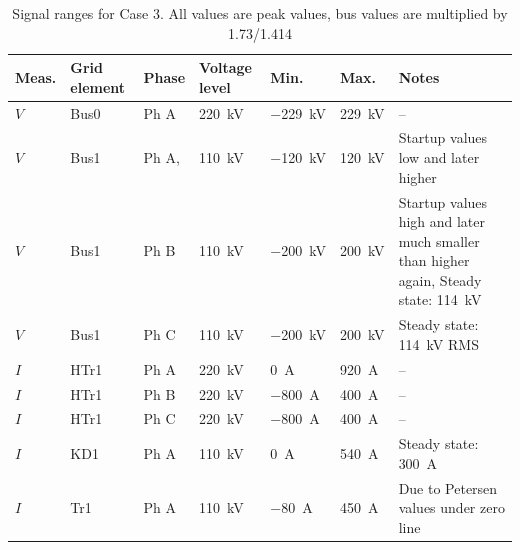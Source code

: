 
\begin{table}[htbp]
  \centering
  \caption{Signal ranges for Case 3. All values are peak values, bus values are multiplied by 1.73/1.414}
  \label{tab:measurement-values-case3}
  \small
  \setlength{\tabcolsep}{3.5pt}
  \renewcommand{\arraystretch}{1.18}
  \begin{tabularx}{\textwidth}{@{}
      >{\raggedright\arraybackslash}p{}
      >{\raggedright\arraybackslash}p{}
      >{\raggedright\arraybackslash}p{}
      >{\raggedright\arraybackslash}p{}
      >{\raggedright\arraybackslash}p{}
      >{\raggedright\arraybackslash}p{}
      Y@{}}
    \toprule
    \textbf{Meas.} &
    \textbf{Grid element} &
    \textbf{Phase} &
    \textbf{Voltage level} &
    \textbf{Min.} &
    \textbf{Max.} &
    \textbf{Notes} \\
    \midrule
    $V$ & Bus0  & Ph A       & \SI{220}{\kilo\volt} & \SI{-229}{\kilo\volt} & \SI{229}{\kilo\volt} & -- \\
    $V$ & Bus1  & Ph A,    & \SI{110}{\kilo\volt} & \SI{-120}{\kilo\volt} & \SI{120}{\kilo\volt} & Startup values low and later higher \\
    $V$ & Bus1  & Ph B     & \SI{110}{\kilo\volt} & \SI{-200}{\kilo\volt} & \SI{200}{\kilo\volt} & Startup values high and later much smaller than higher again, Steady state: \SI{114}{\kilo\volt} \\
    $V$ & Bus1  & Ph C     & \SI{110}{\kilo\volt} & \SI{-200}{\kilo\volt} & \SI{200}{\kilo\volt} & Steady state: \SI{114}{\kilo\volt} RMS \\
    $I$ & HTr1  & Ph A       & \SI{220}{\kilo\volt} & \SI{0}{\ampere} & \SI{920}{\ampere} & -- \\
    $I$ & HTr1  & Ph B       & \SI{220}{\kilo\volt} & \SI{-800}{\ampere} & \SI{400}{\ampere} & -- \\
    $I$ & HTr1  & Ph C       & \SI{220}{\kilo\volt} & \SI{-800}{\ampere} & \SI{400}{\ampere} & -- \\
    $I$ & KD1   & Ph A       & \SI{110}{\kilo\volt} & \SI{0}{\ampere} & \SI{540}{\ampere} & Steady state: \SI{300}{\ampere} \\
    $I$ & Tr1   & Ph A       & \SI{110}{\kilo\volt} & \SI{-80}{\ampere} & \SI{450}{\ampere} & Due to Petersen values under zero line \\

\end{tabularx}
\end{table}
